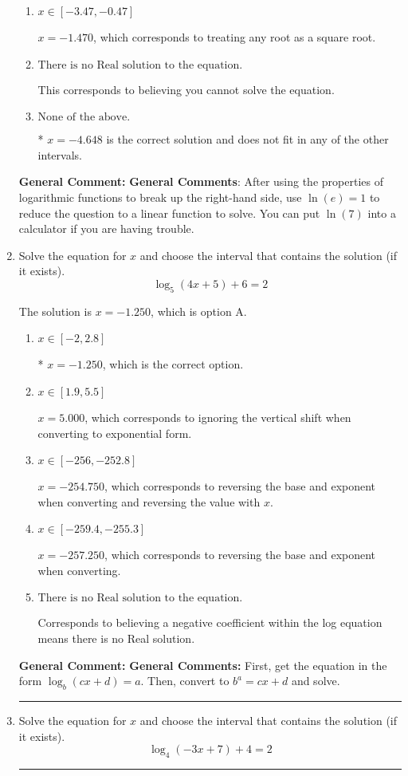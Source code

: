 \documentclass{extbook}[14pt]
\newcommand{\litem}[1]{\item #1

\rule{\textwidth}{0.4pt}}
\begin{document}
\begin{enumerate}
{\begin{enumerate}[label=\Alph*.]
$x = 4.648$, which is the negative of the correct solution.
\item \( x \in [-3.47, -0.47] \)

$x = -1.470$, which corresponds to treating any root as a square root.
\item \( \text{There is no Real solution to the equation.} \)

This corresponds to believing you cannot solve the equation.
\item \( \text{None of the above.} \)

* $x = -4.648$ is the correct solution and does not fit in any of the other intervals.
\end{enumerate}

\textbf{General Comment:} \textbf{General Comments}: After using the properties of logarithmic functions to break up the right-hand side, use $\ln(e) = 1$ to reduce the question to a linear function to solve. You can put $\ln(7)$ into a calculator if you are having trouble.
}
\litem{
Solve the equation for $x$ and choose the interval that contains the solution (if it exists).
\[ \log_{5}{(4x+5)}+6 = 2 \]

The solution is \( x = -1.250 \), which is option A.\begin{enumerate}[label=\Alph*.]
\item \( x \in [-2, 2.8] \)

* $x = -1.250$, which is the correct option.
\item \( x \in [1.9, 5.5] \)

$x = 5.000$, which corresponds to ignoring the vertical shift when converting to exponential form.
\item \( x \in [-256, -252.8] \)

$x = -254.750$, which corresponds to reversing the base and exponent when converting and reversing the value with $x$.
\item \( x \in [-259.4, -255.3] \)

$x = -257.250$, which corresponds to reversing the base and exponent when converting.
\item \( \text{There is no Real solution to the equation.} \)

Corresponds to believing a negative coefficient within the log equation means there is no Real solution.
\end{enumerate}

\textbf{General Comment:} \textbf{General Comments:} First, get the equation in the form $\log_b{(cx+d)} = a$. Then, convert to $b^a = cx+d$ and solve.
}
\litem{
Solve the equation for $x$ and choose the interval that contains the solution (if it exists).
\[ \log_{4}{(-3x+7)}+4 = 2 \]

}
\end{enumerate}
\end{document}
